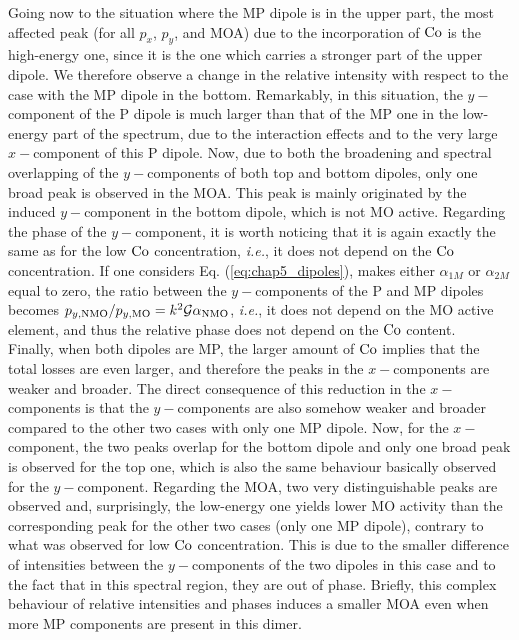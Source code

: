 Going now to the situation where the MP dipole is in the upper part, the most affected peak (for all $p_x$, $p_y$, and MOA) due to the incorporation of $\textnormal{Co}$ is the high-energy one, since it is the one which carries a stronger part of the upper dipole. We therefore observe a change in the relative intensity with respect to the case with the MP dipole in the bottom. Remarkably, in this situation, the $y-$component of the P dipole is much larger than that of the MP one in the low-energy part of the spectrum, due to the interaction effects and to the very large $x-$component of this P dipole. Now, due to both the broadening and spectral overlapping of the $y-$components of both top and bottom dipoles, only one broad peak is observed in the MOA. This peak is mainly originated by the induced $y-$component in the bottom dipole, which is not MO active. Regarding the phase of the $y-$component, it is worth noticing that it is again exactly the same as for the low $\textnormal{Co}$ concentration, \textit{i.e.}, it does not depend on the $\textnormal{Co}$ concentration. If one considers Eq. (\ref{eq:chap5_dipoles}), makes either $\alpha_{1M}$ or $\alpha_{2M}$ equal to zero, the ratio between the $y-$components of the P and MP dipoles becomes $p_{y,\textnormal{NMO}}/p_{y,\textnormal{MO}}=k^2\mathcal{G}\alpha_{\textnormal{NMO}}$, \textit{i.e.}, it does not depend on the MO active element, and thus the relative phase does not depend on the $\textnormal{Co}$ content.\\
Finally, when both dipoles are MP, the larger amount of $\textnormal{Co}$ implies that the total losses are even larger, and therefore the peaks in the $x-$components are weaker and broader. The direct consequence of this reduction in the $x-$components is that the $y-$components are also somehow weaker and broader compared to the other two cases with only one MP dipole. Now, for the $x-$component, the two peaks overlap for the bottom dipole and only one broad peak is observed for the top one, which is also the same behaviour basically observed for the $y-$component. Regarding the MOA, two very distinguishable peaks are observed and, surprisingly, the low-energy one yields lower MO activity than the corresponding peak for the other two cases (only one MP dipole), contrary to what was observed for low $\textnormal{Co}$ concentration. This is due to the smaller difference of intensities between the $y-$components of the two dipoles in this case and to the fact that in this spectral region, they are out of phase. Briefly, this complex behaviour of relative intensities and phases induces a smaller MOA even when more MP components are present in this dimer.\\

